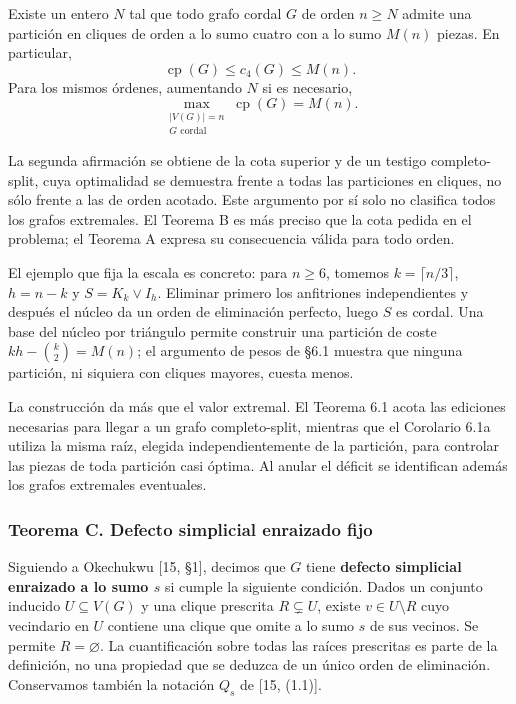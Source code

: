 \documentclass[spanish,11pt,a4paper]{article}
\begin{document}
Existe un entero \(N\) tal que todo grafo cordal \(G\) de orden \(n\ge N\) admite una partición en cliques de orden a lo sumo cuatro con a lo sumo \(M(n)\) piezas. En particular, \[
\operatorname{cp}(G)\le c_4(G)\le M(n).
\tag{1.1}
\] Para los mismos órdenes, aumentando \(N\) si es necesario, \[
\max_{\substack{|V(G)|=n\\G\text{ cordal}}}\operatorname{cp}(G)=M(n).
\tag{1.2}
\]

La segunda afirmación se obtiene de la cota superior y de un testigo completo-split, cuya optimalidad se demuestra frente a todas las particiones en cliques, no sólo frente a las de orden acotado. Este argumento por sí solo no clasifica todos los grafos extremales. El Teorema B es más preciso que la cota pedida en el problema; el Teorema A expresa su consecuencia válida para todo orden.

El ejemplo que fija la escala es concreto: para \(n\ge6\), tomemos \(k=\lceil n/3\rceil\), \(h=n-k\) y \(S=K_k\vee I_h\). Eliminar primero los anfitriones independientes y después el núcleo da un orden de eliminación perfecto, luego \(S\) es cordal. Una base del núcleo por triángulo permite construir una partición de coste \(kh-\binom k2=M(n)\); el argumento de pesos de §6.1 muestra que ninguna partición, ni siquiera con cliques mayores, cuesta menos.

La construcción da más que el valor extremal. El Teorema 6.1 acota las ediciones necesarias para llegar a un grafo completo-split, mientras que el Corolario 6.1a utiliza la misma raíz, elegida independientemente de la partición, para controlar las piezas de toda partición casi óptima. Al anular el déficit se identifican además los grafos extremales eventuales.

\subsubsection{Teorema C. Defecto simplicial enraizado fijo}\label{teorema-c.-defecto-simplicial-enraizado-fijo}

Siguiendo a Okechukwu {[}15, §1{]}, decimos que \(G\) tiene \textbf{defecto simplicial enraizado a lo sumo \(s\)} si cumple la siguiente condición. Dados un conjunto inducido \(U\subseteq V(G)\) y una clique prescrita \(R\subsetneq U\), existe \(v\in U\setminus R\) cuyo vecindario en \(U\) contiene una clique que omite a lo sumo \(s\) de sus vecinos. Se permite \(R=\varnothing\). La cuantificación sobre todas las raíces prescritas es parte de la definición, no una propiedad que se deduzca de un único orden de eliminación. Conservamos también la notación \(Q_s\) de {[}15, (1.1){]}.
\end{document}

